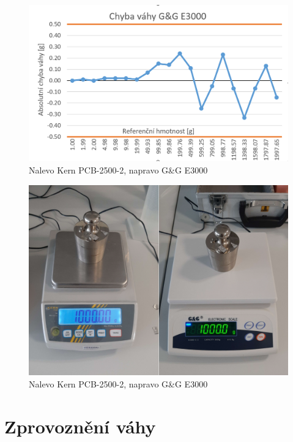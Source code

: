 \begin{figure}[H]
    \begin{center}
        \includegraphics[scale=0.7]{obrazky/mereni.PNG}
    \end{center}
    \caption{Nalevo Kern PCB-2500-2, napravo G\&G E3000}
    \label{adapter}
\end{figure}

\begin{figure}[H]
    \begin{center}
        \includegraphics[scale=0.1]{obrazky/vahy.jpg}
    \end{center}
    \caption{Nalevo Kern PCB-2500-2, napravo G\&G E3000}
    \label{adapter}
\end{figure}

\section{Zprovoznění váhy}

